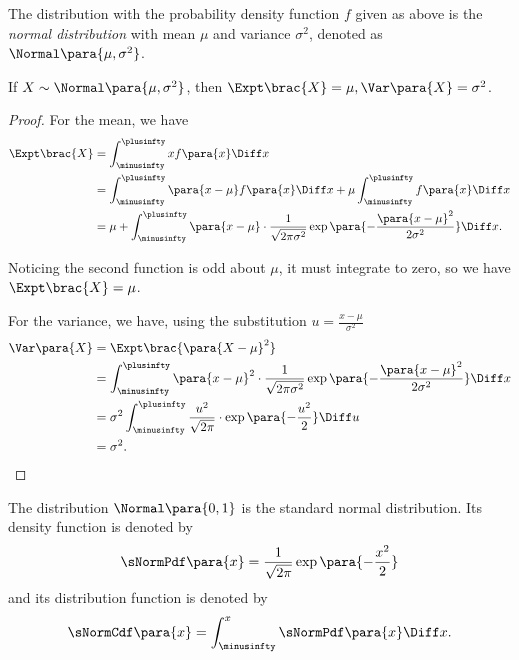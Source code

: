 \begin{definition}
    \label{def:normal}%
    The distribution with the probability density function \(f\) given as above is the \emph{normal distribution} with mean \(\mu\) and variance \(\sigma^2\), denoted as \(\Normal\para{\mu, \sigma^2}\).
\end{definition}

\begin{proposition}
    \label{prop:mean-variance-normal}%
    If \(X \sim \Normal\para{\mu, \sigma^2}\), then \(\Expt\brac{X} = \mu, \Var\para{X} = \sigma^2\).
\end{proposition}

\begin{proof}
    For the mean, we have
    \begin{align*}
        \Expt\brac{X} &= \int_{\minusinfty}^{\plusinfty} x f\para{x} \Diff x \\
        &= \int_{\minusinfty}^{\plusinfty} \para{x - \mu} f\para{x} \Diff x + \mu \int_{\minusinfty}^{\plusinfty} f\para{x} \Diff x \\
        &= \mu + \int_{\minusinfty}^{\plusinfty} \para{x - \mu} \cdot \frac{1}{\sqrt{2 \pi \sigma^2}} \exp\para{-\frac{\para{x - \mu}^2}{2 \sigma^2}} \Diff x.
    \end{align*}

    Noticing the second function is odd about \(\mu\), it must integrate to zero, so we have \(\Expt\brac{X} = \mu\).

    For the variance, we have, using the substitution \(u = \frac{x - \mu}{\sigma^2}\)
    \begin{align*}
        \Var\para{X} &= \Expt\brac{\para{X - \mu}^2} \\
        &=  \int_{\minusinfty}^{\plusinfty} \para{x - \mu}^2 \cdot \frac{1}{\sqrt{2 \pi \sigma^2}} \exp\para{-\frac{\para{x - \mu}^2}{2 \sigma^2}} \Diff x \\
        &= \sigma^2 \int_{\minusinfty}^{\plusinfty} \frac{u^2}{\sqrt{2\pi}} \cdot \exp\para{-\frac{u^2}{2}} \Diff u \\
        &= \sigma^2.
    \end{align*}
\end{proof}

\begin{definition}
    \label{def:standard-normal}%
    The distribution \(\Normal\para{0, 1}\) is the standard normal distribution. Its density function is denoted by
    \[
        \sNormPdf\para{x} = \frac{1}{\sqrt{2\pi}} \exp\para{- \frac{x^2}{2}}
    \]
    and its distribution function is denoted by
    \[
        \sNormCdf\para{x} = \int_{\minusinfty}^{x} \sNormPdf\para{x} \Diff x.
    \]  
\end{definition}


